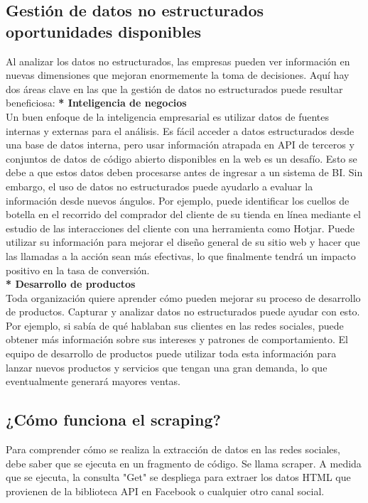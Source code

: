 \documentclass[twocolumn]{article}
\begin{document}
\subsection{Gestión de datos no estructurados oportunidades disponibles}
Al analizar los datos no estructurados, las empresas pueden ver información en nuevas dimensiones que mejoran 
enormemente la toma de decisiones. Aquí hay dos áreas clave en las que la gestión de datos no estructurados puede 
resultar beneficiosa:
\textbf{* Inteligencia de negocios}\\
Un buen enfoque de la inteligencia empresarial es utilizar datos de fuentes internas y
 externas para el análisis. Es fácil acceder a datos estructurados desde una base de 
 datos interna, pero usar información atrapada en API de terceros y conjuntos de datos 
 de código abierto disponibles en la web es un desafío. Esto se debe a que estos datos 
 deben procesarse antes de ingresar a un sistema de BI. Sin embargo, el uso de datos no
  estructurados puede ayudarlo a evaluar la información desde nuevos ángulos. Por ejemplo, 
  puede identificar los cuellos de botella en el recorrido del comprador del cliente de su 
  tienda en línea mediante el estudio de las interacciones del cliente con una herramienta 
  como Hotjar. Puede utilizar su información para mejorar el diseño general de su sitio web 
  y hacer que las llamadas a la acción sean más efectivas, lo que finalmente tendrá un 
  impacto positivo en la tasa de conversión.\\

  \textbf{* Desarrollo de productos}\\
  Toda organización quiere aprender cómo pueden mejorar su 
  proceso de desarrollo de productos. Capturar y analizar
  datos no estructurados puede ayudar con esto. Por ejemplo,
   si sabía de qué hablaban sus clientes en las redes sociales,
  puede obtener más información sobre sus intereses y patrones
   de comportamiento. El equipo de desarrollo de productos puede
  utilizar toda esta información para lanzar nuevos productos
 y servicios que tengan una gran demanda, lo que eventualmente
   generará mayores ventas.
   
\subsection{¿Cómo funciona el scraping?}

Para comprender cómo se realiza la extracción de datos en las redes sociales, debe saber que se ejecuta en un fragmento de código. Se llama scraper. A medida que se ejecuta, la consulta "Get" se despliega para extraer los datos HTML que provienen de la biblioteca API en Facebook o cualquier otro canal social.
\end{document}
